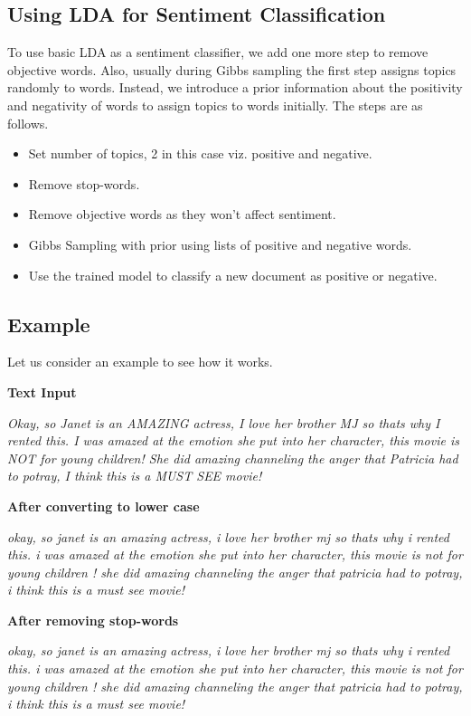 \subsection{Using LDA for Sentiment Classification}

To use basic LDA as a sentiment classifier, we add one more step to remove objective words. Also, usually during Gibbs sampling the first step assigns topics 
randomly to words. Instead, we introduce a prior information about the positivity and negativity of words to assign topics to words initially. The steps are 
as follows.

\begin{itemize}
 \item Set number of topics, 2 in this case viz. positive and negative.
 \item Remove stop-words.
 \item Remove objective words as they won't affect sentiment.
 \item Gibbs Sampling with prior using lists of positive and negative words.
 \item Use the trained model to classify a new document as positive or negative.
\end{itemize}


\subsection{Example}

Let us consider an example to see how it works. 

\textbf{Text Input}

\textit{ Okay, so Janet is an AMAZING actress, I love her brother MJ so thats why I rented this. I was amazed at the emotion she put into her character, this 
movie is NOT for young children! She did amazing channeling the anger that Patricia had to potray, I think this is a MUST SEE movie!}

\textbf{After converting to lower case}

\textit{ okay, so janet is an amazing actress, i love her brother mj so thats why i rented this. i was amazed at the emotion she put into her character, this 
movie is not for young children ! she did amazing channeling the anger that patricia had to potray, i think this is a must see movie!}

\textbf{After removing stop-words}

\textit{ {\color[rgb]{0.4,0.4,0.4}okay, so} janet {\color[rgb]{0.4,0.4,0.4}is an} amazing actress, {\color[rgb]{0.4,0.4,0.4}i} love {\color[rgb]{0.4,0.4,0.4}her}
brother mj {\color[rgb]{0.4,0.4,0.4}so thats why i} rented {\color[rgb]{0.4,0.4,0.4}this}. {\color[rgb]{0.4,0.4,0.4}i was} amazed {\color[rgb]{0.4,0.4,0.4}at the}
emotion {\color[rgb]{0.4,0.4,0.4}she put into her} character, {\color[rgb]{0.4,0.4,0.4}this} movie {\color[rgb]{0.4,0.4,0.4}is not for} young children ! 
{\color[rgb]{0.4,0.4,0.4}she did} amazing channeling {\color[rgb]{0.4,0.4,0.4}the} anger {\color[rgb]{0.4,0.4,0.4}that} patricia {\color[rgb]{0.4,0.4,0.4}had to} 
potray, {\color[rgb]{0.4,0.4,0.4}i} think {\color[rgb]{0.4,0.4,0.4}this is a} must {\color[rgb]{0.4,0.4,0.4}see} movie!}

